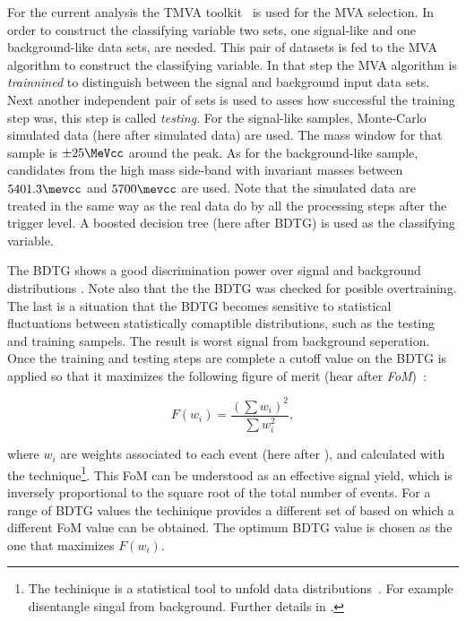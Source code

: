 For the current analysis the TMVA toolkit~\cite{TMVA} is used for the MVA selection. In order to construct the classifying variable 
two sets, one signal-like and one background-like data sets, are needed. This pair of datasets is fed to the MVA algorithm 
to construct the classifying variable. In that step the MVA algorithm is {\it trainnined} to distinguish between the signal 
and background input data sets. Next another independent pair of sets is used to asses how successful the training step was, this step is called {\it testing}. 
For the signal-like samples, \BsJpsiKst Monte-Carlo simulated data (here after simulated data)
are used. The \Bs mass window for that sample is $\pm 25 \MeVcc$ around the \Bs peak. As for the background-like sample, candidates from the high mass side-band
with invariant masses between $5401.3\mevcc$ and $5700\mevcc$ are used. Note that the simulated data are treated in the same way as
the real data do by all the processing steps after the \lone trigger level. A boosted decision tree (here after BDTG) is used as the classifying variable. 

The BDTG shows a good discrimination power over signal and background distributions . Note also that the the
BDTG was checked for posible overtraining. The last is a situation that the BDTG becomes sensitive to statistical fluctuations between
statistically comaptible distributions, such as the testing and training sampels. The result is worst signal from background seperation.
Once the training and testing steps are complete a cutoff value on the BDTG is applied so that it maximizes the following figure of merit
(hear after {\it FoM})~\cite{Yuehong_fom}:

\begin{equation}
\label{eqn:fom}
F(w_i) = \frac{\left(\sum{w_{i}}\right)^2}{\sum{w_{i}^2}},
\end{equation}

\noindent where $w_i$ are weights associated to each event (here after \sWeights), and calculated with the \sPlot 
technique\footnote{The \sPlot techinique is a statistical tool to unfold data distributions~\cite{splot}. 
For example disentangle singal from background. Further details in . }.
This FoM can be understood as an effective signal yield, which is inversely proportional to the square root of the total number of events.
For a range of BDTG values the \sPlot techinique provides a different set of \sWeights based on which a different FoM value can be obtained. 
The optimum BDTG value is chosen as the one that maximizes $F(w_i)$.

